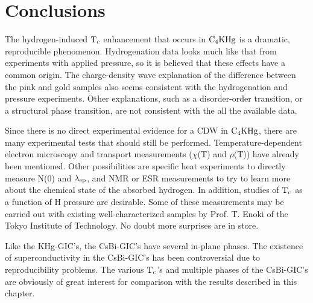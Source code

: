 \section{Conclusions}
\label{hydconcl}

        The  hydrogen-induced $\rm T_c$  enhancement that   occurs  in $\rm
C_4KHg$ is a  dramatic, reproducible  phenomenon.  Hydrogenation data looks
much like that from  experiments with applied pressure,  so it  is believed
that  these effects  have  a  common    origin.  The charge-density    wave
explanation of the difference between the pink  and gold samples also seems
consistent   with  the   hydrogenation and  pressure   experiments.   Other
explanations, such as  a disorder-order transition, or  a  structural phase
transition, are not consistent with the all the available data.

        Since there  is no  direct experimental evidence  for a CDW in $\rm
C_4KHg$, there are many experimental  tests that should still be performed.
Temperature-dependent  electron  microscopy   and   transport  measurements
($\chi$(T) and $\rho$(T)) have already been mentioned.  Other possibilities
are specific heat  experiments to directly  measure N(0) and $\rm \lambda_{ep}$, and
NMR or  ESR measurements to try to  learn more about the chemical  state of
the absorbed hydrogen.  In addition, studies of $\rm T_c$ as a  function of
H pressure are  desirable.  Some of these  measurements may be  carried out
with existing well-characterized samples by Prof.   T.  Enoki of  the Tokyo
Institute of Technology.  No doubt more surprises are in store.

        Like the KHg-GIC's,  the  CsBi-GIC's have several  in-plane phases.
The existence of superconductivity in the CsBi-GIC's has been controversial
due to reproducibility problems.\cite{lagrange87}  The  various $\rm T_c$'s
and multiple phases of the  CsBi-GIC's are obviously of  great interest for
comparison with the results described in this chapter.

